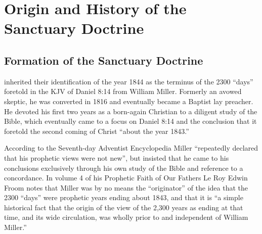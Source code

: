 \part{Origin and History of the Sanctuary Doctrine}
\label{p:origin}

\chapter{Formation of the Sanctuary Doctrine}
\label{ch:formation}

 inherited their identification of the year
1844 as the terminus of the 2300 ``days'' foretold in the KJV of Daniel 8:14
from William Miller. Formerly an avowed skeptic, he was converted in 1816
and eventually became a Baptist lay preacher. He devoted his first two years 
as a born-again Christian to a diligent study of the Bible, which eventually
came to a focus on Daniel 8:14 and the conclusion that it foretold the
second coming of Christ ``about the year 1843.''

According to the Seventh-day Adventist Encyclopedia Miller ``repeatedly
declared that his prophetic views were not new'', but insisted that he came
to his conclusions exclusively through his own study of the Bible and
reference to a concordance. In volume 4 of his Prophetic Faith of Our
Fathers Le Roy Edwin Froom notes that Miller was by no means the
``originator'' of the idea that the 2300 ``days'' were prophetic years ending
about 1843, and that it is ``a simple historical fact that the origin of the
view of the 2,300 years as ending at that time, and its wide circulation,
was wholly prior to and independent of William Miller.''\cite{1}

